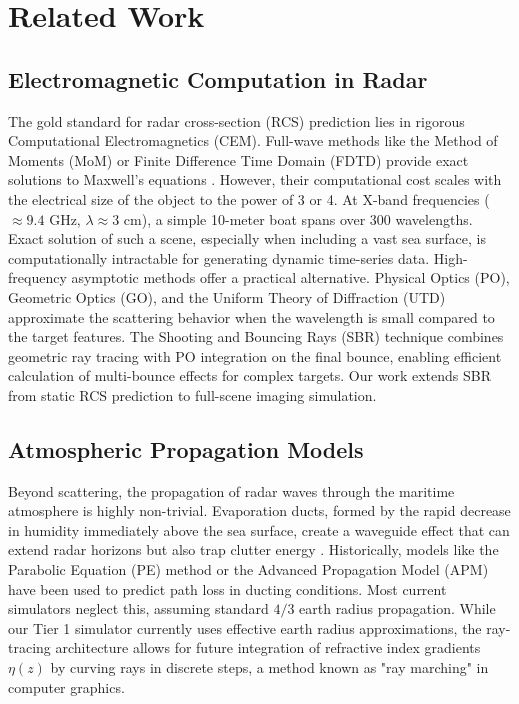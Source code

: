 \documentclass[conf]{new-aiaa}
\begin{document}
\section{Related Work}

\subsection{Electromagnetic Computation in Radar}
The gold standard for radar cross-section (RCS) prediction lies in rigorous Computational Electromagnetics (CEM). Full-wave methods like the Method of Moments (MoM) or Finite Difference Time Domain (FDTD) provide exact solutions to Maxwell's equations \cite{jin2015finite}. However, their computational cost scales with the electrical size of the object to the power of 3 or 4. At X-band frequencies ($\approx 9.4$ GHz, $\lambda \approx 3$ cm), a simple 10-meter boat spans over 300 wavelengths. Exact solution of such a scene, especially when including a vast sea surface, is computationally intractable for generating dynamic time-series data. High-frequency asymptotic methods offer a practical alternative. Physical Optics (PO), Geometric Optics (GO), and the Uniform Theory of Diffraction (UTD) approximate the scattering behavior when the wavelength is small compared to the target features. The Shooting and Bouncing Rays (SBR) technique \cite{ling1989shooting} combines geometric ray tracing with PO integration on the final bounce, enabling efficient calculation of multi-bounce effects for complex targets. Our work extends SBR from static RCS prediction to full-scene imaging simulation.

\subsection{Atmospheric Propagation Models}
Beyond scattering, the propagation of radar waves through the maritime atmosphere is highly non-trivial. Evaporation ducts, formed by the rapid decrease in humidity immediately above the sea surface, create a waveguide effect that can extend radar horizons but also trap clutter energy \cite{barrios1994estimation}. Historically, models like the Parabolic Equation (PE) method or the Advanced Propagation Model (APM) have been used to predict path loss in ducting conditions. Most current simulators neglect this, assuming standard $4/3$ earth radius propagation. While our Tier 1 simulator currently uses effective earth radius approximations, the ray-tracing architecture allows for future integration of refractive index gradients $\eta(z)$ by curving rays in discrete steps, a method known as "ray marching" in computer graphics.
\end{document}
